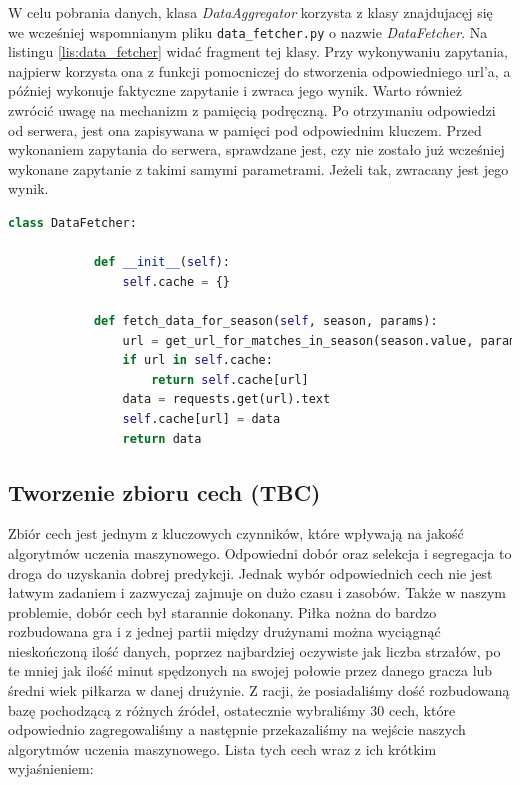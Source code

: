         W celu pobrania danych, klasa \emph{DataAggregator} korzysta z klasy znajdujacęj się we wcześniej wspomnianym pliku \texttt{data\_fetcher.py} o nazwie \emph{DataFetcher}. Na listingu \ref{lis:data_fetcher} widać fragment tej klasy. Przy wykonywaniu zapytania, najpierw korzysta ona z funkcji pomocniczej do stworzenia odpowiedniego url'a, a później wykonuje faktyczne zapytanie i zwraca jego wynik. Warto również zwrócić uwagę na mechanizm z pamięcią podręczną. Po otrzymaniu odpowiedzi od serwera, jest ona zapisywana w pamięci pod odpowiednim kluczem. Przed wykonaniem zapytania do serwera, sprawdzane jest, czy nie zostało już wcześniej wykonane zapytanie z takimi samymi parametrami. Jeżeli tak, zwracany jest jego wynik.
        
        
        \begin{lstlisting}[language=Python, label={lis:data_fetcher}, caption=Fragment klasy \emph{DataFetcher}]
        class DataFetcher:

            def __init__(self):
                self.cache = {}

            def fetch_data_for_season(self, season, params):
                url = get_url_for_matches_in_season(season.value, params)
                if url in self.cache:
                    return self.cache[url]
                data = requests.get(url).text
                self.cache[url] = data
                return data
        \end{lstlisting}
    
        
        
        \subsection{Tworzenie zbioru cech (TBC)}
        \noindent Zbiór cech jest jednym z kluczowych czynników, które wpływają na jakość algorytmów uczenia maszynowego. Odpowiedni dobór oraz selekcja i segregacja to droga do uzyskania dobrej predykcji. Jednak wybór odpowiednich cech nie jest łatwym zadaniem i zazwyczaj zajmuje on dużo czasu i zasobów. Także w naszym problemie, dobór cech był starannie dokonany. Piłka nożna do bardzo rozbudowana gra i z jednej partii między drużynami można wyciągnąć nieskończoną ilość danych, poprzez najbardziej oczywiste jak liczba strzałów, po te mniej jak ilość minut spędzonych na swojej połowie przez danego gracza lub średni wiek piłkarza w danej drużynie. Z racji, że posiadaliśmy dość rozbudowaną bazę pochodzącą z różnych źródeł, ostatecznie wybraliśmy 30 cech, które odpowiednio zagregowaliśmy a następnie przekazaliśmy na wejście naszych algorytmów uczenia maszynowego. Lista tych cech wraz z ich krótkim wyjaśnieniem:
        
